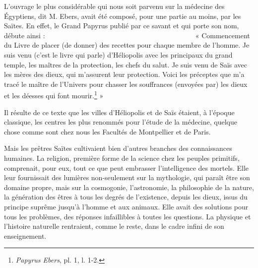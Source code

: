 \documentclass[letterpaper,twocolumn,openany,nodeprecatedcode]{dndbook}
\newcommand*\hieroAAAD{}
\newcommand*\hieroAAAG{}
\newcommand*\hieroAAAH{}
\newcommand*\hieroAAAQ{}
\newcommand*\hieroAAAU{}
\newcommand*\hieroAAAW{\raisebox{0.5ex}{}}
\newcommand*\hieroAABM{}
\newcommand*\hieroAABN{}
\newcommand*\hieroAABR{}
\newcommand*\hieroAACB{\raisebox{0.5ex}{}}
\newcommand*\hieroAACM{}
\newcommand*\hieroAACS{}
\newcommand*\hieroAADB{}
\newcommand*\hieroAADC{\raisebox{0.5ex}{}}
\newcommand*\hieroAADF{}
\newcommand*\hieroAADU{}
\newcommand*\hieroAAEC{}
\newcommand*\hieroAAEF{}
\newcommand*\hieroAAEK{}
\newcommand*\hieroAAEL{}
\newcommand*\hieroAAEP{\raisebox{0.5ex}{}}
\newcommand*\hieroAAEZ{}
\newcommand*\hieroAAFQ{}
\newcommand*\hieroAAFS{}
\newcommand*\hieroAAHT{}
\newcommand*\hieroAAHY{}
\newcommand*\hieroAAJW{}
\newcommand*\hieroAAJX{}
\newcommand*\hieroAAJY{}
\newcommand*\hieroAAJZ{}
\newcommand*\hieroAAKA{}
\newcommand*\hieroAAKB{}
\newcommand*\hieroAAKC{}
\newcommand*\hieroAAKD{}
\newcommand*\hieroAAKE{}
\newcommand*\hieroAAKF{}
\newcommand*\hieroAAKG{}
\newcommand*\hieroAAKH{}
\newcommand*\hieroAAKI{}
\newcommand*\hieroAAKJ{}
\newcommand*\hieroAAKK{\raisebox{0.5ex}{}}
\newcommand*\hieroAAKL{}
\newcommand*\hieroAAKM{}
\newcommand*\hieroAAKN{}
\newcommand*\hieroAAKO{}
\newcommand*\hieroAAKP{}
\newcommand*\hieroAAKQ{}
\newcommand*\hieroAAKR{}
\newcommand*\hieroAAKS{}
\newcommand*\hieroAAKT{}
\newcommand*\hieroAAKU{}
\newcommand*\hieroAAKV{}
\newcommand*\hieroAAKW{}
\newcommand*\hieroAAKX{}
\newcommand*\hieroAAKY{}
\newcommand*\hieroAAKZ{}
\newcommand*\hieroAALA{}
\newcommand*\hieroAALB{}
\newcommand*\hieroAALC{}
\begin{document}
L'ouvrage le plus considérable qui nous soit parvenu sur la médecine des Égyptiens, dit M. Ebers, avait été composé, pour une partie au moins, par les Saïtes. En effet, le Grand Papyrus publié par ce savant et qui porte son nom, débute ainsi : $\hieroAAJW\:\hieroAABR\:\hieroAAJX\allowbreak\:\hieroAAJY\:\hieroAAEZ\:\hieroAAJZ\allowbreak\:\hieroAAKA\:\hieroAAKB\:\hieroAAEC\allowbreak\:\hieroAAKC\:\hieroAAFS\:\hieroAAAQ\allowbreak\:\hieroAAKD\:\hieroAADU\:\hieroAAKE\allowbreak\:\hieroAABR\:\hieroAAEL\:\hieroAAKF\allowbreak\:\hieroAAEZ\:\hieroAAHT\:\hieroAAFQ\allowbreak\:\hieroAADC\:\hieroAADB\:\hieroAAEF\allowbreak\:\hieroAAKG\:\hieroAABN\:\hieroAAAU\allowbreak\:\hieroAADB\:\hieroAAEF\:\hieroAAKH\allowbreak\:\hieroAABR\:\hieroAAKI\:\hieroAAKJ\allowbreak\:\hieroAABM\:\hieroAAKK\:\hieroAADC\allowbreak\:\hieroAADB\:\hieroAAEF\:\hieroAAKL\allowbreak\:\hieroAABR\:\hieroAAKM\:\hieroAADU\allowbreak\:\hieroAAKE\:\hieroAABR\:\hieroAAAD\allowbreak\:\hieroAAAG\:\hieroAADC\:\hieroAAAW\allowbreak\:\hieroAAEZ\:\hieroAAKN\:\hieroAAKO\allowbreak\:\hieroAAKP\:\hieroAADB\:\hieroAAEF\allowbreak\:\hieroAAEK\:\hieroAAEK\:\hieroAAEK\allowbreak\:\hieroAADB\:\hieroAAEF\:\hieroAAKQ\allowbreak\:\hieroAACS\:\hieroAAKR\:\hieroAAKE\allowbreak\:\hieroAABR\:\hieroAAKI\:\hieroAAKJ\allowbreak\:\hieroAAEF\:\hieroAACS\:\hieroAAKR\allowbreak\:\hieroAAAH\:\hieroAACM\:\hieroAAKS\allowbreak\:\hieroAADC\:\hieroAADF\:\hieroAAEF\allowbreak\:\hieroAAKE\:\hieroAAKT\:\hieroAAKU\allowbreak\:\hieroAAKV\:\hieroAADB\:\hieroAAEP\allowbreak\:\hieroAAKW\:\hieroAAHY\:\hieroAAKX\allowbreak\:\hieroAAKY\:\hieroAAEK\:\hieroAADB\allowbreak\:\hieroAAEK\:\hieroAAKZ\:\hieroAALA\allowbreak\:\hieroAALB\:\hieroAALC\allowbreak\:\hieroAALB\:\hieroAALC\:\hieroAACB$ « Commencement du Livre de placer (de donner) des recettes pour chaque membre de l'homme. Je suis venu (c'est le livre qui parle) d'Héliopolis avec les principaux du grand temple, les maîtres de la protection, les chefs du salut. Je suis venu de Saïs avec les mères des dieux, qui m'assurent leur protection. Voici les préceptes que m'a tracé le maître de l'Univers pour chasser les souffrances (envoyées par) les dieux et les déesses qui font mourir.\footnote{\emph{Papyrus Ebers}, pl. 1, l. 1-2.} »

Il résulte de ce texte que les villes d'Héliopolis et de Saïs étaient, à l'époque classique, les centres les plus renommés pour l'étude de la médecine, quelque chose comme sont chez nous les Facultés de Montpellier et de Paris.

Mais les prêtres Saïtes cultivaient bien d'autres branches des connaissances humaines. La religion, première forme de la science chez les peuples primitifs, comprenait, pour eux, tout ce que peut embrasser l'intelligence des mortels. Elle leur fournissait des lumières non-seulement sur la mythologie, qui paraît être son domaine propre, mais sur la cosmogonie, l'astronomie, la philosophie de la nature, la génération des êtres à tous les degrés de l'existence, depuis les dieux, issus du principe suprême jusqu'à l'homme et aux animaux. Elle avait des solutions pour tous les problèmes, des réponses infaillibles à toutes les questions. La physique et l'histoire naturelle rentraient, comme le reste, dans le cadre infini de son enseignement.
\end{document}

